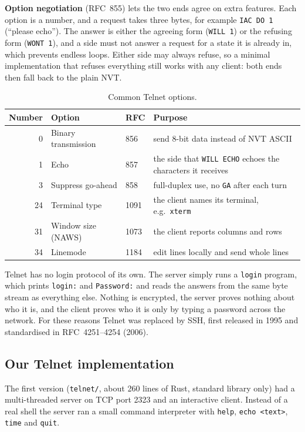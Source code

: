 \textbf{Option negotiation} (RFC~855) lets the two ends agree on extra
features. Each option is a number, and a request takes three bytes, for
example \texttt{IAC DO 1} (``please echo''). The answer is either the
agreeing form (\texttt{WILL 1}) or the refusing form (\texttt{WONT 1}), and a
side must not answer a request for a state it is already in, which prevents
endless loops. Either side may always refuse, so a minimal implementation that
refuses everything still works with any client: both ends then fall back to
the plain NVT.

\begin{table}[H]
\centering
\small
\begin{tabular}{@{}r l l l@{}}
\toprule
Number & Option & RFC & Purpose \\
\midrule
0  & Binary transmission & 856  & send 8-bit data instead of NVT ASCII \\
1  & Echo                & 857  & the side that \texttt{WILL ECHO} echoes the characters it receives \\
3  & Suppress go-ahead   & 858  & full-duplex use, no \texttt{GA} after each turn \\
24 & Terminal type       & 1091 & the client names its terminal, e.g.\ \texttt{xterm} \\
31 & Window size (NAWS)  & 1073 & the client reports columns and rows \\
34 & Linemode            & 1184 & edit lines locally and send whole lines \\
\bottomrule
\end{tabular}
\caption{Common Telnet options.}
\end{table}

Telnet has no login protocol of its own. The server simply runs a
\texttt{login} program, which prints \texttt{login:} and \texttt{Password:} and
reads the answers from the same byte stream as everything else. Nothing is
encrypted, the server proves nothing about who it is, and the client proves
who it is only by typing a password across the network. For these reasons
Telnet was replaced by SSH, first released in 1995 and standardised in
RFC~4251--4254 (2006).

\subsection{Our Telnet implementation}

The first version (\texttt{telnet/}, about 260 lines of Rust, standard library only) had a
multi-threaded server on TCP port 2323 and an interactive client. Instead of a
real shell the server ran a small command interpreter with \texttt{help},
\texttt{echo <text>}, \texttt{time} and \texttt{quit}.

